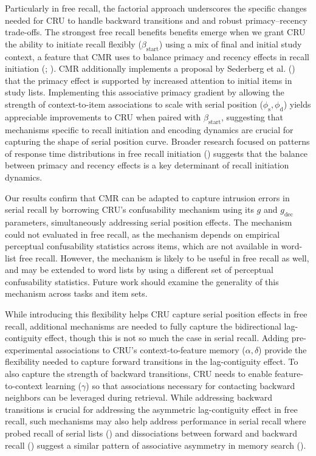 \documentclass[
  man,
  floatsintext,
  longtable,
  nolmodern,
  notxfonts,
  notimes,
  draftfirst,
  colorlinks=true,linkcolor=blue,citecolor=blue,urlcolor=blue]{apa7}
\begin{document}
Particularly in free recall, the factorial approach underscores the
specific changes needed for CRU to handle backward transitions and and
robust primacy--recency trade-offs. The strongest free recall benefits
benefits emerge when we grant CRU the ability to initiate recall
flexibly (\(\beta_\text{start}\)) using a mix of final and initial study
context, a feature that CMR uses to balance primacy and recency effects
in recall initiation (; ). CMR
additionally implements a proposal by Sederberg et al.
() that the primacy effect is
supported by increased attention to initial items in study lists.
Implementing this associative primacy gradient by allowing the strength
of context-to-item associations to scale with serial position
(\(\phi_\text{s}, \phi_\text{d}\)) yields appreciable improvements to
CRU when paired with \(\beta_\text{start}\), suggesting that mechanisms
specific to recall initiation and encoding dynamics are crucial for
capturing the shape of serial position curve. Broader research focused
on patterns of response time distributions in free recall initiation
() suggests that the
balance between primacy and recency effects is a key determinant of
recall initiation dynamics.

Our results confirm that CMR can be adapted to capture intrusion errors
in serial recall by borrowing CRU's confusability mechanism using its
\(g\) and \(g_\text{dec}\) parameters, simultaneously addressing serial
position effects. The mechanism could not evaluated in free recall, as
the mechanism depends on empirical perceptual confusability statistics
across items, which are not available in word-list free recall. However,
the mechanism is likely to be useful in free recall as well, and may be
extended to word lists by using a different set of perceptual
confusability statistics. Future work should examine the generality of
this mechanism across tasks and item sets.

While introducing this flexibility helps CRU capture serial position
effects in free recall, additional mechanisms are needed to fully
capture the bidirectional lag-contiguity effect, though this is not so
much the case in serial recall. Adding pre-experimental associations to
CRU's context-to-feature memory (\(\alpha, \delta\)) provide the
flexibility needed to capture forward transitions in the lag-contiguity
effect. To also capture the strength of backward transitions, CRU needs
to enable feature-to-context learning (\(\gamma\)) so that associations
necessary for contacting backward neighbors can be leveraged during
retrieval. While addressing backward transitions is crucial for
addressing the asymmetric lag-contiguity effect in free recall, such
mechanisms may also help address performance in serial recall where
probed recall of serial lists
() and
dissociations between forward and backward recall
() suggest a
similar pattern of associative asymmetry in memory search
().
\end{document}
